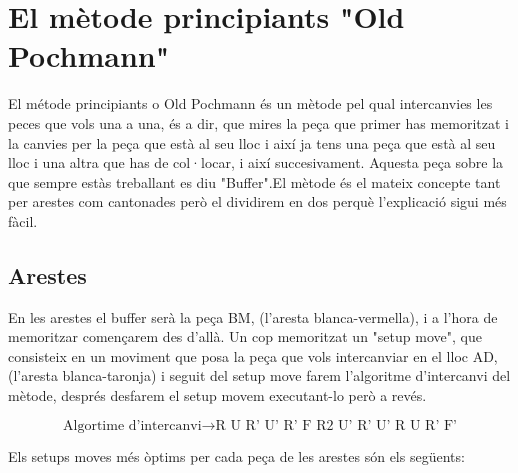 \section{El mètode principiants "Old Pochmann"}

El métode principiants o Old Pochmann és un mètode pel qual intercanvies les peces que vols una a una, és a dir, que mires la peça que primer has memoritzat i la canvies per la peça que està al seu lloc i així ja tens una peça que està al seu lloc i una altra que has de col·locar, i així succesivament.
Aquesta peça sobre la que sempre estàs treballant es diu "Buffer".El mètode és el mateix concepte tant per arestes com cantonades però el dividirem en dos perquè l'explicació sigui més fàcil.

\subsection{Arestes}

En les arestes el buffer serà la peça BM, (l'aresta blanca-vermella), i a l'hora de memoritzar començarem des d'allà. Un cop memoritzat un "setup move", que consisteix en un moviment que posa la peça que vols intercanviar en el lloc AD, (l'aresta blanca-taronja) i seguit del setup move farem l'algoritme d'intercanvi del mètode, després desfarem el setup movem executant-lo però a revés.


$$ \textrm{Algortime d'intercanvi} \rightarrow \textrm{R U R' U' R' F R2 U' R' U' R U R' F'} $$

Els setups moves més òptims per cada peça de les arestes són els següents:

